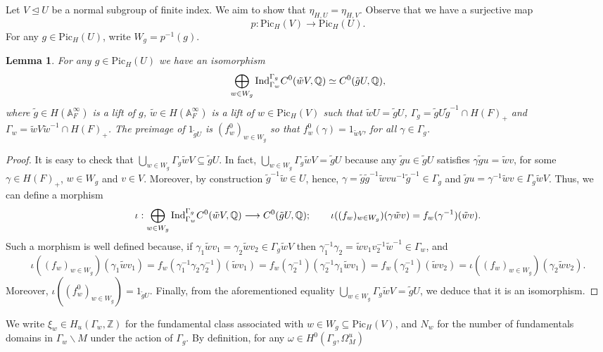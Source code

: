 \documentclass{amsart}
\newtheorem{lemma}[theorem]{Lemma}
\theoremstyle{definition}
\theoremstyle{remark}
\numberwithin{equation}{section}
\newcommand{\Pic}{\mathrm{Pic}}
\newcommand{\Z}{{\mathbb Z}}
\newcommand{\A}{{\mathbb A}}
\newcommand{\Q}{{\mathbb Q}}
\begin{document}
Let $V\unlhd U$ be a normal subgroup of finite index. We aim to show that $\eta_{H,U}=\eta_{H,V}$. Observe that we have a surjective map
\[
p:\Pic_H(V)\rightarrow\Pic_H(U).
\]
For any $g\in \Pic_H(U)$, write $W_g=p^{-1}(g)$.
\begin{lemma}\label{lemma:above}
    For any $g\in \Pic_H(U)$ we have an isomorphism
    \[
    \bigoplus_{w\in W_g}{\rm Ind}_{\Gamma_{w}}^{\Gamma_g}C^0(\tilde{w}V,\Q)\simeq C^0(\tilde g U,\Q),
    \]
    where $\tilde{g}\in H(\A_F^\infty)$ is a lift of $g$, $\tilde{w}\in H(\A_F^\infty)$ is a lift of $w\in \Pic_H(V)$ such that $\tilde wU=\tilde gU$, $\Gamma_g=\tilde gU\tilde g^{-1}\cap H(F)_+$ and $\Gamma_w=\tilde wV\tilde w^{-1}\cap H(F)_+$. The preimage of $1_{\tilde gU}$ is $(f^0_w)_{w\in W_g}$ so that $f^0_w(\gamma)=1_{\tilde wV}$, for all $\gamma\in\Gamma_g$.
\end{lemma}
\begin{proof}
    It is easy to check that $\bigcup_{w\in W_g}\Gamma_g\tilde wV\subseteq \tilde gU$. In fact, $\bigcup_{w\in W_g}\Gamma_g\tilde wV= \tilde gU$ because any $\tilde gu\in\tilde gU$ satisfies $\gamma\tilde g u=\tilde w v$, for some $\gamma\in H(F)_+$, $w\in W_g$ and $v\in V$. Moreover, by construction $\tilde g^{-1}\tilde w\in U$, hence, $\gamma=\tilde g\tilde g^{-1}\tilde w vu^{-1}\tilde g^{-1}\in \Gamma_g$ and $\tilde g u=\gamma^{-1}\tilde wv\in \Gamma_g\tilde wV$. Thus,     
    we can define a morphism
    \[
    \iota:\bigoplus_{w\in W_g}{\rm Ind}_{\Gamma_{w}}^{\Gamma_g}C^0(\tilde{w}V,\Q)\longrightarrow C^0(\tilde g U,\Q);\qquad \iota((f_w)_{w\in W_g})(\gamma\tilde wv)=f_w(\gamma^{-1})(\tilde w v).
    \]
    Such a morphism is well defined because, if $\gamma_1\tilde wv_1=\gamma_2\tilde wv_2\in \Gamma_g\tilde wV$ then $\gamma_1^{-1}\gamma_2=\tilde w v_1v_2^{-1}\tilde w^{-1}\in \Gamma_w$, and
        \[
        \iota((f_w)_{w\in W_g})(\gamma_1\tilde wv_1)=f_w(\gamma_1^{-1}\gamma_2\gamma_2^{-1})(\tilde w v_1)=f_w(\gamma_2^{-1})(\gamma_2^{-1}\gamma_1\tilde w v_1)=f_w(\gamma_2^{-1})(\tilde w v_2)=\iota((f_w)_{w\in W_g})(\gamma_2\tilde wv_2).
        \]
        Moreover, $\iota((f^0_w)_{w\in W_g})=1_{\tilde gU}$.
    Finally, from the aforementioned equality $\bigcup_{w\in W_g}\Gamma_g\tilde wV= \tilde gU$, we deduce that it is an isomorphism.
\end{proof}
We write $\xi_{w}\in H_u(\Gamma_{w},\Z)$ for the fundamental class associated with $w\in W_{g}\subseteq\Pic_H(V)$, and $N_{w}$ for the number of fundamentals domains in $\Gamma_{w}\backslash M$ under the action of $\Gamma_{g}$. By definition, for any $\omega\in H^0(\Gamma_g,\Omega^u_M)$
\end{document}
